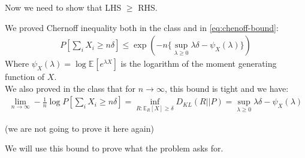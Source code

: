 \documentclass{article}
\numberwithin{equation}{section}
\newcommand{\EX}[2][]{\mathbb{E}_{#1}\left[#2\right]}%
\begin{document}
Now we need to show that LHS \(\ge\) RHS.

We proved Chernoff inequality both in the class and in \eqref{eq:chenoff-bound}:
\begin{align}
P\left[ \sum_i X_i \ge n\delta \right] \le \exp \left( -n \{\sup_{\lambda \ge 0} \lambda\delta - \psi_X(\lambda) \} \right)
\end{align}
Where \(\psi_X(\lambda) = \log \EX{e^{\lambda X}}\) is the logarithm of the moment generating function of \(X\).\\
We also proved in the class that for \(n \to \infty\), this bound is tight and we have:
\begin{align}
\lim_{n\to \infty}-\frac{1}{n}\log P\left[ \sum_i X_i \ge n\delta \right] = \inf_{R: \EX[R]{X} \ge \delta} D_{KL}(R||P) = \sup_{\lambda \ge 0} \lambda\delta - \psi_X(\lambda)
\label{eq:tight-chernoff}
\end{align}

(we are not going to prove it here again)

We will use this bound to prove what the problem asks for.
\end{document}
